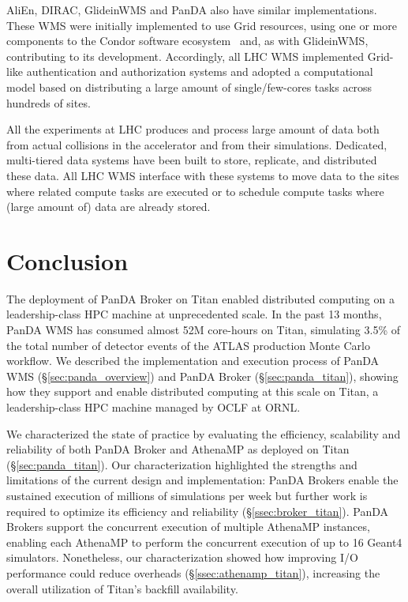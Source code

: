 \documentclass[conference]{IEEEtran}
\begin{document}
AliEn, DIRAC, GlideinWMS and PanDA also have similar implementations. These WMS
were initially implemented to use Grid resources, using one or more components
to the Condor software ecosystem~\cite{thain2005distributed} and, as with
GlideinWMS, contributing to its development. Accordingly, all LHC WMS
implemented Grid-like authentication and authorization systems and adopted a
computational model based on distributing a large amount of single/few-cores
tasks across hundreds of sites.

All the experiments at LHC produces and process large amount of data both from
actual collisions in the accelerator and from their simulations. Dedicated,
multi-tiered data systems have been built to store, replicate, and distributed
these data. All LHC WMS interface with these systems to move data to the sites
where related compute tasks are executed or to schedule compute tasks where
(large amount of) data are already stored.


\section{Conclusion}
\label{sec:conclusion}

The deployment of PanDA Broker on Titan enabled distributed computing on a
leadership-class HPC machine at unprecedented scale. In the past 13 months,
PanDA WMS has consumed almost 52M core-hours on Titan, simulating 3.5\% of the
total number of detector events of the ATLAS production Monte Carlo workflow. We
described the implementation and execution process of PanDA WMS
(\S\ref{sec:panda_overview}) and PanDA Broker (\S\ref{sec:panda_titan}), showing
how they support and enable distributed computing at this scale on Titan, a
leadership-class HPC machine managed by OCLF at ORNL.

We characterized the state of practice by evaluating the efficiency, scalability
and reliability of both PanDA Broker and AthenaMP as deployed on Titan
(\S\ref{sec:panda_titan}). Our characterization highlighted the strengths
and limitations of the current design and implementation: PanDA Brokers enable
the sustained execution of millions of simulations per week but further work is
required to optimize its efficiency and reliability (\S\ref{ssec:broker_titan}).
PanDA Brokers support the concurrent execution of multiple AthenaMP instances,
enabling each AthenaMP to perform the concurrent execution of up to 16 Geant4
simulators. Nonetheless, our characterization showed how improving I/O
performance could reduce overheads (\S\ref{ssec:athenamp_titan}), increasing the
overall utilization of Titan's backfill availability.
\end{document}
